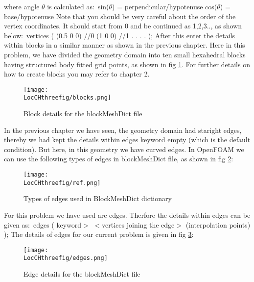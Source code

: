 \flushleft where angle {$\theta$}  is calculated as{$:$}
\flushleft sin({$\theta$}) = perpendicular/hypotenuse
\flushleft cos({$\theta$}) = base/hypotenuse
\flushleft Note that you should be very careful about the order of the vertex coordinates. It should start from 0 and be continued as 1,2,3.., as shown below{$:$}
\flushleft vertices
\flushleft(
\flushleft  (0.5 0 0)	//0
\flushleft  (1 0 0)	//1
\flushleft.
\flushleft.
\flushleft.
\flushleft.
\flushleft);
\flushleft After this enter the details within blocks in a similar manner as shown in the previous chapter. Here in this problem, we have divided the geometry domain into ten small hexahedral blocks having structured body fitted grid points, as shown in fig \ref{blocks}. For further details on how to create blocks you may refer to chapter 2.

\begin{figure}[ht]  
\begin{center}  
\texttt{[image: \\LocCHthreefig/blocks.png]}
\caption{Block details for the blockMeshDict file}
\label{blocks}
\end{center}  
\end{figure}

\flushleft In the previous chapter we have seen, the geometry domain had staright edges, thereby we had kept the details within edges keyword  empty (which is the default condition). But here, in this geometry we have curved edges. In OpenFOAM we can use the following types of edges in blockMeshDict file, as shown in fig \ref{ref}{$:$}

\begin{figure}[ht]  
\begin{center}  
\texttt{[image: \\LocCHthreefig/ref.png]}
\caption{Types of edges used in BlockMeshDict dictionary}
\label{ref}
\end{center}  
\end{figure}

\flushleft For this problem we have used arc edges. Therfore the details within edges can be given as{$:$}
\flushleft edges
\flushleft (
 \flushleft{$<$}keyword{$>$} {$<$}vertices joining the edge{$>$} (interpolation points)
\flushleft);
\flushleft The details of edges for our current problem is given in fig \ref{edges}{$:$}

\begin{figure}[ht]  
\begin{center}  
\texttt{[image: \\LocCHthreefig/edges.png]}
\caption{Edge details for the blockMeshDict file}
\label{edges}
\end{center}  
\end{figure}

